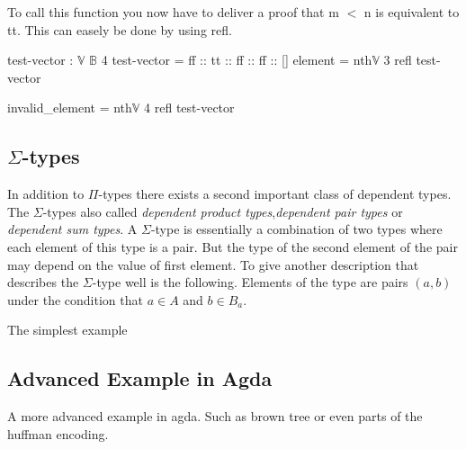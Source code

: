 To call this function you now have to deliver a proof that m $<$ n is equivalent to tt. This can easely be done by using refl. 
\begin{codesnippet}[mathescape=true, caption={Definition of nth function in Agda}, label={codeSnippet:vector_nth}]
test-vector : $\mathbb{V}$ $\mathbb{B}$ 4
test-vector = ff :: tt :: ff :: ff :: []
element = nth$\mathbb{V}$ 3 refl test-vector

invalid_element = nth$\mathbb{V}$ 4 refl test-vector
\end{codesnippet}


\subsection{$\Sigma$-types}
In addition to $\Pi$-types there exists a second important class of dependent types. The $\Sigma$-types also called \emph{dependent product types}\cite{10.1145/2841316},\emph{dependent pair types}\cite{10.1145/2841316} or \emph{dependent sum types}\cite{10.5555/1076265}.
A $\Sigma$-type is essentially a combination of two types where each element of this type is a pair. But the type of the second element of the pair may depend on the value of first element.
To give another description that describes the $\Sigma$-type well is the following. Elements of the type are pairs $(a, b)$ under the condition that $a \in A$ and $b \in B_a$.



The simplest example 
\subsection{Advanced Example in Agda}
A more advanced example in agda. Such as brown tree or even parts of the huffman encoding.